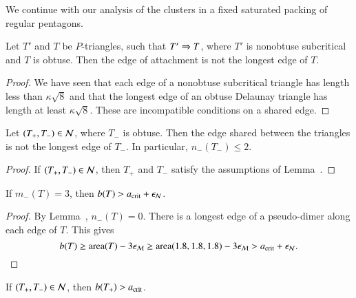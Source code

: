 

We continue with our analysis of the clusters in a fixed saturated
packing of regular pentagons.  

\begin{lemma}  
  Let $T'$ and $T$ be $P$-triangles, such that $T'\Rightarrow T$, where
  $T'$ is nonobtuse subcritical and $T$ is obtuse.  Then the edge
  of attachment is not the longest edge of $T$.
\end{lemma}

\begin{proof} We have seen that each edge of a nonobtuse subcritical
  triangle has length less than $\kappa\sqrt8$ and that the longest edge of an
  obtuse Delaunay triangle has length at least $\kappa\sqrt{8}$.  These are
  incompatible conditions on a shared edge.
\end{proof}

\begin{corollary}  
  Let $(T_+,T_-)\in\mathcal N$, where $T_-$ is obtuse.  Then the edge shared between the triangles is
  not the longest edge of $T_-$.  In particular, $n_-(T_-)\le 2$.
\end{corollary}

\begin{proof} If $(T_+,T_-)\in \mathcal N$, then $T_+$ and $T_-$ satisfy the
  assumptions of Lemma~.
\end{proof}

\begin{lemma} 
If $m_-(T) = 3$, then $b(T) > a_\text{crit} + \epsilon_{\mathcal N}$.
\end{lemma}

\begin{proof}  By Lemma~, $n_-(T)=0$.
There is a longest edge of a pseudo-dimer along each edge of $T$.
This gives
\[
b(T) \ge {\operatorname{area}}(T) - 3\epsilon_{\mathcal M} \ge {\operatorname{area}}(1.8,1.8,1.8) - 3\epsilon_{\mathcal M} > a_\text{crit} + \epsilon_{\mathcal N}.
\]
\end{proof}

\begin{lemma}  If $(T_+,T_-)\in \mathcal N$, then $b(T_+)>a_\text{crit}$.
\end{lemma}

